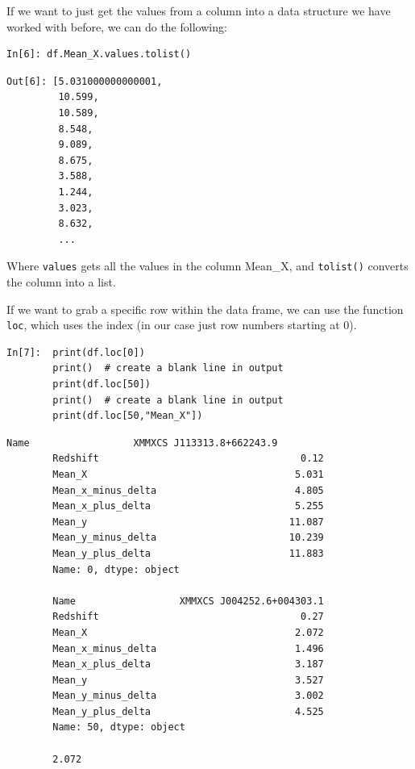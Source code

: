 \newpage

If we want to just get the values from a column into a data structure we have worked with before, we can do the following:

\begin{lstlisting}[style=PY]
In[6]: df.Mean_X.values.tolist()
\end{lstlisting}
\begin{lstlisting}[style=PY_out]
Out[6]: [5.031000000000001,
         10.599,
         10.589,
         8.548,
         9.089,
         8.675,
         3.588,
         1.244,
         3.023,
         8.632,
         ...
\end{lstlisting}


Where \texttt{values} gets all the values in the column Mean\_X, and \texttt{tolist()} converts the column into a list. 

If we want to grab a specific row within the data frame, we can use the function \texttt{loc}, which uses the index (in our case just row numbers starting at 0).

\begin{lstlisting}[style=PY]
In[7]:  print(df.loc[0])
        print()  # create a blank line in output
        print(df.loc[50])
        print()  # create a blank line in output
        print(df.loc[50,"Mean_X"])
\end{lstlisting}

\begin{lstlisting}[style=PY_out]
        Name                  XMMXCS J113313.8+662243.9
        Redshift                                   0.12
        Mean_X                                    5.031
        Mean_x_minus_delta                        4.805
        Mean_x_plus_delta                         5.255
        Mean_y                                   11.087
        Mean_y_minus_delta                       10.239
        Mean_y_plus_delta                        11.883
        Name: 0, dtype: object
        
        Name                  XMMXCS J004252.6+004303.1
        Redshift                                   0.27
        Mean_X                                    2.072
        Mean_x_minus_delta                        1.496
        Mean_x_plus_delta                         3.187
        Mean_y                                    3.527
        Mean_y_minus_delta                        3.002
        Mean_y_plus_delta                         4.525
        Name: 50, dtype: object
        
        2.072
\end{lstlisting}

